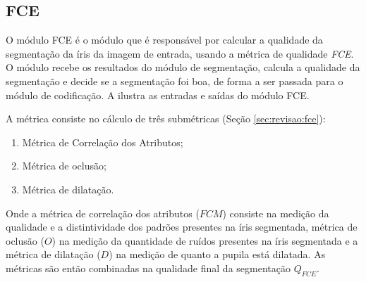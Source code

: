
\FloatBarrier

\subsection{FCE}\label{sec:metodologia:fce}

\par O módulo \acrshort{FCE} é o módulo que é responsável por calcular a qualidade da segmentação da íris da imagem de entrada, usando a métrica de qualidade \textit{\acrshort{FCE}}. O módulo recebe os resultados do módulo de segmentação, calcula a qualidade da segmentação e decide se a segmentação foi boa, de forma a ser passada para o módulo de codificação. A  ilustra as entradas e saídas do módulo \acrshort{FCE}.


\par A métrica consiste no cálculo de três submétricas (Seção \ref{sec:revisao:fce}):

\begin{enumerate}
    \item Métrica de Correlação dos Atributos;
    \item Métrica de oclusão;
    \item Métrica de dilatação.
\end{enumerate}

\par Onde a métrica de correlação dos atributos ($FCM$) consiste na medição da qualidade e a distintividade dos padrões presentes na íris segmentada, métrica de oclusão ($O$) na medição da quantidade de ruídos presentes na íris segmentada e a métrica de dilatação ($D$) na medição de quanto a pupila está dilatada. As métricas são então combinadas na qualidade final da segmentação $Q_{FCE}$.

